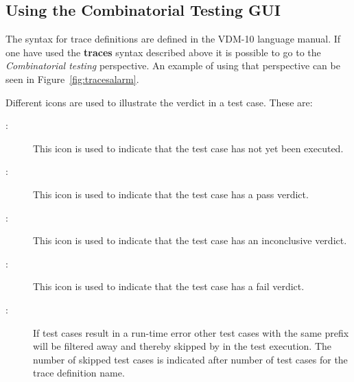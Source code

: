 \documentclass{overturerepsec}
\begin{document}
\subsection{Using the Combinatorial Testing GUI}

The syntax for trace definitions are defined in the VDM-10 language
manual.
If one have used the {\bf\ttfamily traces} syntax described above it
is possible to go to the \emph{Combinatorial testing}
perspective. An example of using that
perspective can be seen in
Figure~\ref{fig:tracesalarm}.

Different icons are used to illustrate the verdict in a test
case. These are:
\begin{description}
\item[\hspace{-1.8mm}
:]
  This icon is used to indicate that the test case has not yet been
  executed.
\item[\hspace{-1.8mm}
:] This icon is used to indicate that the test case has a pass
  verdict.
\item[\hspace{-1.8mm}
:] This icon is used to indicate that the test case has an inconclusive
  verdict.
\item[\hspace{-1.8mm}
:]
This icon is used to indicate that the test case has a fail
verdict.
\item[\hspace{-1.8mm}
:] 
If test cases result in a run-time error other test cases with the
same prefix will be filtered away and thereby skipped by in the test
execution. The number of skipped test cases is indicated after number
of test cases for the trace definition name.
\end{description}
\end{document}
